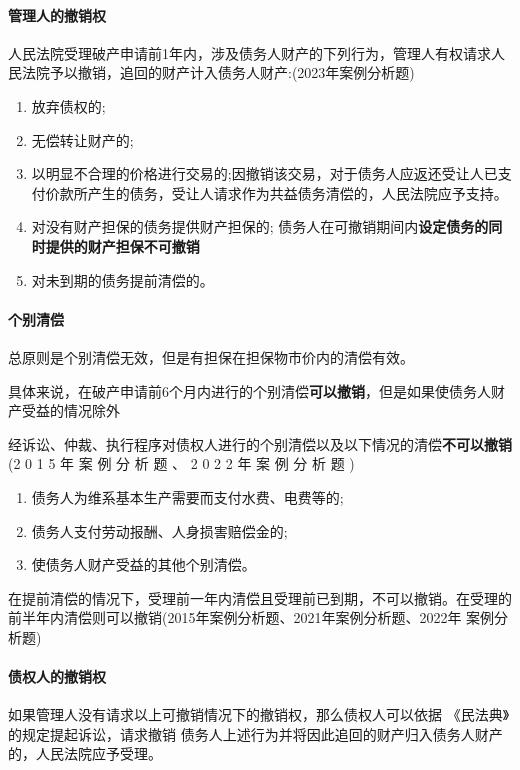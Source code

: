 \documentclass[UTF8,12pt]{ctexart}
\numberwithin{equation}{section} %
\numberwithin{figure}{section}
\numberwithin{table}{section}
\begin{document}
	\paragraph{管理人的撤销权}
	人民法院受理破产申请前1年内，涉及债务人财产的下列行为，管理人有权请求人民法院予以撤销，追回的财产计入债务人财产:(2023年案例分析题)
	\begin{enumerate}
		\item 放弃债权的;
		
		\item 无偿转让财产的;
		
		\item 以明显不合理的价格进行交易的;因撤销该交易，对于债务人应返还受让人已支 付价款所产生的债务，受让人请求作为共益债务清偿的，人民法院应予支持。
		
		\item 对没有财产担保的债务提供财产担保的; 债务人在可撤销期间内\textbf{设定债务的同时提供的财产担保不可撤销}
		
		\item 对未到期的债务提前清偿的。
	\end{enumerate}
	
	
	
	\paragraph{个别清偿}
	总原则是个别清偿无效，但是有担保在担保物市价内的清偿有效。
	
	具体来说，在破产申请前6个月内进行的个别清偿\textbf{可以撤销}，但是如果使债务人财产受益的情况除外
	
	经诉讼、仲裁、执行程序对债权人进行的个别清偿以及以下情况的清偿\textbf{不可以撤销}(2 0 1 5 年 案 例 分 析 题 、 2 0 2 2 年 案 例 分 析 题 ) 
	\begin{enumerate}
		\item 债务人为维系基本生产需要而支付水费、电费等的; 
		
		\item 债务人支付劳动报酬、人身损害赔偿金的;
		
		\item 使债务人财产受益的其他个别清偿。
	\end{enumerate}
	
	在提前清偿的情况下，受理前一年内清偿且受理前已到期，不可以撤销。在受理的前半年内清偿则可以撤销(2015年案例分析题、2021年案例分析题、2022年 案例分析题)

	
	\paragraph{债权人的撤销权}
	如果管理人没有请求以上可撤销情况下的撤销权，那么债权人可以依据 《民法典》的规定提起诉讼，请求撤销 债务人上述行为并将因此追回的财产归入债务人财产的，人民法院应予受理。
	
\end{document}
